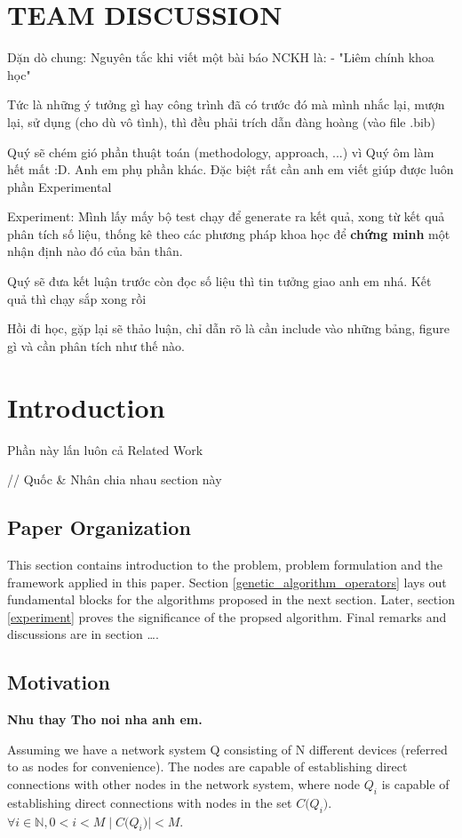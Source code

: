 \documentclass[runningheads]{llncs}
\begin{document}
\section{TEAM DISCUSSION}
Dặn dò chung: Nguyên tắc khi viết một bài báo NCKH là:
- "Liêm chính khoa học"

Tức là những ý tưởng gì hay công trình đã có trước đó mà mình nhắc lại, mượn lại, sử dụng (cho dù vô tình), 
thì đều phải trích dẫn đàng hoàng (vào file .bib)

Quý sẽ chém gió phần thuật toán (methodology, approach, ...) vì Quý ôm làm hết mất :D. 
Anh em phụ phần khác. Đặc biệt rất cần anh em viết giúp được luôn phần Experimental

Experiment: Mình lấy mấy bộ test chạy để generate ra kết quả, xong từ kết quả phân tích số liệu, thống kê theo các phương pháp khoa học để 
\textbf{chứng minh} một nhận định nào đó của bản thân.

Quý sẽ đưa kết luận trước còn đọc số liệu thì tin tưởng giao anh em nhá. Kết quả thì chạy sắp xong rồi

Hồi đi học, gặp lại sẽ thảo luận, chỉ dẫn rõ là cần include vào những bảng, figure gì và cần phân tích như thế nào.

\section{Introduction} \label{introduction}
Phần này lấn luôn cả Related Work

// Quốc \& Nhân chia nhau section này

\subsection*{Paper Organization}
This section contains introduction to the problem, problem formulation and the framework applied in this paper. Section \ref{genetic_algorithm_operators} lays out fundamental blocks for the algorithms proposed in the next section. Later, section \ref{experiment} proves the significance of the propsed algorithm. Final remarks and discussions are in section \dots.

\subsection*{Motivation}
\textbf{Nhu thay Tho noi nha anh em.}

Assuming we have a network system Q consisting of N different devices (referred to as nodes for convenience). 
The nodes are capable of establishing direct connections with other nodes in the network system, 
where node $Q_{i}$ is capable of establishing direct connections with nodes in the set $C \big(Q_{i} \big)$.
$\forall i \in \mathbb{N}, 0 < i < M \mid C \big(Q_{i} \big) \mid < M$.
\end{document}

